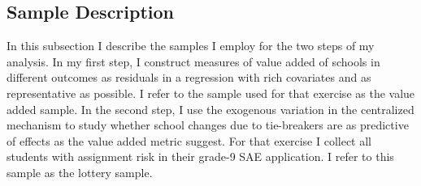 \documentclass[a4paper, article, english, oneside, unknownkeysallowed, 12pt]{memoir}
\begin{document}






\subsection{Sample Description}

In this subsection I describe the samples I employ for the two steps of my analysis. 
In my first step, I construct measures of value added of schools in different outcomes as residuals in a regression with rich covariates and as representative as possible.
I refer to the sample used for that exercise as the value added sample.
In the second step, I use the exogenous variation in the centralized mechanism to study whether school changes due to tie-breakers are as predictive of effects as the value added metric suggest. 
For that exercise I collect all students with assignment risk in their grade-9 SAE application.
I refer to this sample as the lottery sample. 
\end{document}
